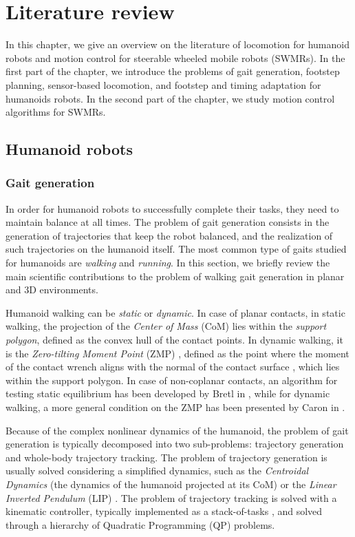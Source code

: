 \chapter{Literature review}
\label{ch:literature-review}
In this chapter, we give an overview on the literature of locomotion for
humanoid robots and motion control for
steerable wheeled mobile robots (SWMRs). In the first part of 
the chapter, we introduce the problems of 
gait generation, footstep planning, sensor-based locomotion, and footstep and 
timing adaptation for humanoids robots. In the second part of the chapter,
we study motion control algorithms for SWMRs.

\section{Humanoid robots}
\subsection{Gait generation}
In order for humanoid robots to successfully complete their tasks, they need to 
maintain balance at all times. The problem of gait generation consists in the
generation of trajectories that keep the robot balanced, and the realization of 
such trajectories on the humanoid itself. The most common type of gaits studied for 
humanoids are \textit{walking} and \textit{running}.
In this section, we briefly review the main 
scientific contributions to the problem of walking gait generation in 
planar and 3D environments.

Humanoid walking can be \textit{static} or \textit{dynamic}. In case of planar
contacts, in static walking, the 
projection of the \textit{Center of Mass} (CoM) lies within the
\textit{support polygon},
defined as the convex hull of the contact points. In dynamic walking, 
it is the \textit{Zero-tilting Moment Point} (ZMP) \cite{Vukobratovic1972ZMP},
defined as the point 
where the moment of the contact wrench aligns with the normal of the contact 
surface \cite{SardainBessonnet2004}, which lies within the support polygon.
In case of non-coplanar contacts,
an algorithm for testing static equilibrium has been developed by Bretl in
\cite{Bretl2008TestingStaticEquilibriumforLeggedRobots}, while for dynamic
walking, a more general
condition on the ZMP has been presented by Caron in
\cite{Caron2017TRO}.

Because of the complex nonlinear dynamics of the humanoid, the problem of gait 
generation is typically decomposed into two sub-problems: trajectory generation and 
whole-body trajectory tracking. The problem of trajectory generation is 
usually solved considering a simplified dynamics, such as the \textit{Centroidal
Dynamics} (the dynamics of the humanoid projected at its CoM)
\cite{Orin2013CentroidalDynamics} or the \textit{Linear Inverted Pendulum} (LIP)
\cite{Kajita1991LIP}. The problem of trajectory tracking is solved with a 
kinematic controller, typically implemented as a
stack-of-tasks \cite{Escande2014IJRR}, and solved through a hierarchy of 
Quadratic Programming (QP) problems.

